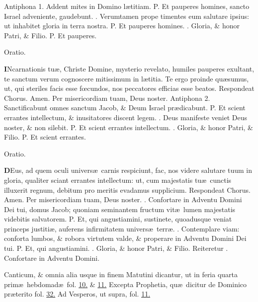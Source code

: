 \documentclass[letter,11pt]{book}
\makeatletter
\DeclareRobustCommand{\Vbar}{\vers@resp{-0.1em}{V}}
\DeclareRobustCommand{\Rbar}{\vers@resp{0pt}{R}}
\newcommand{\vers@resp@sym}{\raisebox{0.2ex}{\rotatebox[origin=c]{-20}{$\m@th\rceil$}}}
\newcommand{\vers@resp}[2]{%
  {\ooalign{\hidewidth\kern#1\vers@resp@sym\hidewidth\cr#2\cr}}%
}%
\def\P{\color{Red} P. \color{black}}
\def\V{\color{Red} \Vbar . \color{black}}
\def\R{\color{Red} \Rbar . \color{black}}
\makeatother
\begin{document}
\begin{multicols}{2}
\newline \color{Red} Antiphona 1. \color{black} Addent mites in Domino l\ae titiam. \P Et pauperes homines, sancto Israel adveniente, gaudebunt. \V Verumtamen prope timentes eum salutare ipsius: ut inhabitet gloria in terra nostra. \P Et pauperes homines. \V Gloria, \& honor Patri, \& Filio. \P Et pauperes.
\vspace{-.5em} \begin{center} \color{Red} Oratio. \color{black} \end{center} \vspace{-.5em}
\lettrine[lines=2]{\bfseries \color{Red} I}{}Ncarnationis tu\ae , Christe Domine, mysterio revelato, humiles pauperes exultant, te sanctum verum cognoscere mitissimum in l\ae titia. Te ergo proinde qu\ae sumus, ut, qui steriles facis esse f\oe cundos, nos peccatores efficias esse beatos. \color{Red} Respondeat Chorus. \color{black} Amen. Per misericordiam tuam, Deus noster.
\newline \color{Red} Antiphona 2. \color{black} Sanctificabunt omnes sanctum Jacob, \& Deum Israel pr\ae dicabunt. \P Et scient errantes intellectum, \& inusitatores discent legem. \V Deus manifeste veniet Deus noster, \& non silebit. \P Et scient errantes intellectum. \V Gloria, \& honor Patri, \& Filio. \P Et scient errantes.
\vspace{-.5em} \begin{center} \color{Red} Oratio. \color{black} \end{center} \vspace{-.5em}
\lettrine[lines=2]{\bfseries \color{Red} D}{}Eus, ad quem oculi univers\ae \ carnis respiciunt, fac, nos videre salutare tuum in gloria, qualiter sciant errantes intellectum: ut, cum majestatis tu\ae \ cunctis illuxerit regnum, debitum pro meritis evadamus supplicium. \color{Red} Respondeat Chorus. \color{black} Amen. Per misericordiam tuam, Deus noster.
\newline \R Confortare in Adventu Domini Dei tui, domus Jacob; quoniam seminantem fructum vit\ae \ lumen majestatis videbitis salvatorem. \P Et, qui angustiamini, sustinete, quoadusque veniat princeps justiti\ae , auferens infirmitatem univers\ae \ terr\ae . \V Contemplare viam: conforta lumbos, \& robora virtutem valde, \& properare in Adventu Domini Dei tui. \P Et, qui angustiamini. \V Gloria, \& honor Patri, \& Filio. \color{Red} Reiteretur \color{black} \R Confortare in Adventu Domini.%
\par \color{Red} Canticum, \& omnia alia usque in finem Matutini dicantur, ut in feria quarta prim\ae \ hebdomad\ae \ fol. \color{black} \hyperlink{WED-PRIMA-ADV-MAT}{10.} \& \hyperlink{WED-PRIMA-ADV-LAU}{11.} \color{Red} Excepta Prophetia, qu\ae \ dicitur de Dominico pr\ae terito fol. \color{black} \hyperlink{micheas.4}{32.} \color{Red} Ad Vesperos, ut supra, fol. \color{black} \hyperlink{WED-PRIMA-ADV-VES}{11.}

\end{multicols}
\end{document}
